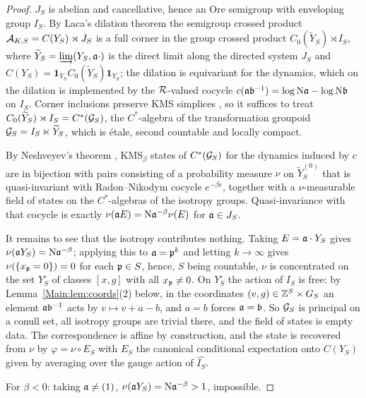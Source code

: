 \begin{proof}
$J_S$ is abelian and cancellative, hence an Ore semigroup with enveloping group
$I_S$. By Laca's dilation theorem \cite{Laca} the semigroup crossed product
$\mathcal{A}_{K,S}=C(Y_S)\rtimes J_S$ is a full corner in the group crossed product
$C_0(\widetilde Y_S)\rtimes I_S$, where
$\widetilde Y_S=\varinjlim(Y_S,\mathfrak{a}\cdot)$ is the direct limit along the
directed system $J_S$ and $C(Y_S)=\mathbf 1_{Y_S}C_0(\widetilde Y_S)\mathbf 1_{Y_S}$;
the dilation is equivariant for the dynamics, which on the dilation is
implemented by the $\mathcal{R}$-valued cocycle $c(\mathfrak{a}\mathfrak{b}^{-1})=\log\mathrm{N}\mathfrak{a}-\log\mathrm{N}\mathfrak{b}$
on $I_S$. Corner inclusions preserve KMS simplices \cite[\S3]{Laca}, so it
suffices to treat $C_0(\widetilde Y_S)\rtimes I_S=C^*(\mathcal{G}_S)$, the $C^*$-algebra
of the transformation groupoid $\mathcal{G}_S=I_S\ltimes\widetilde Y_S$, which is
étale, second countable and locally compact.

By Neshveyev's theorem \cite[Thm.~1.3]{Nesh13}, $\mathrm{KMS}_\beta$ states of
$C^*(\mathcal{G}_S)$ for the dynamics induced by $c$ are in bijection with pairs
consisting of a probability measure $\nu$ on $\widetilde Y_S^{(0)}$ that is
quasi-invariant with Radon--Nikodym cocycle $e^{-\beta c}$, together with a
$\nu$-measurable field of states on the $C^*$-algebras of the isotropy groups.
Quasi-invariance with that cocycle is exactly
$\nu(\mathfrak{a} E)=\mathrm{N}\mathfrak{a}^{-\beta}\nu(E)$ for $\mathfrak{a}\in J_S$.

It remains to see that the isotropy contributes nothing. Taking
$E=\mathfrak{a}\cdot Y_S$ gives $\nu(\mathfrak{a} Y_S)=\mathrm{N}\mathfrak{a}^{-\beta}$; applying this to
$\mathfrak{a}=\mathfrak{p}^k$ and letting $k\to\infty$ gives $\nu(\{x_{\mathfrak{p}}=0\})=0$ for each
$\mathfrak{p}\in S$, hence, $S$ being countable, $\nu$ is concentrated on the set
$Y_S^\circ$ of classes $[x,g]$ with all $x_{\mathfrak{p}}\neq0$. On $Y_S^\circ$ the action
of $I_S$ is free: by Lemma~\ref{Main:lem:coords}(2) below, in the coordinates
$(v,g)\in\mathbb{Z}^S\times G_S$ an element $\mathfrak{a}\mathfrak{b}^{-1}$ acts by
$v\mapsto v+a-b$, and $a=b$ forces $\mathfrak{a}=\mathfrak{b}$. So $\mathcal{G}_S$ is principal on a
conull set, all isotropy groups are trivial there, and the field of states is
empty data. The correspondence is affine by construction, and the state is
recovered from $\nu$ by $\varphi=\nu\circ E_S$ with $E_S$ the canonical
conditional expectation onto $C(Y_S)$ given by averaging over the gauge action
of $\widehat{I_S}$.

For $\beta<0$: taking $\mathfrak{a}\neq(1)$, $\nu(\mathfrak{a} Y_S)=\mathrm{N}\mathfrak{a}^{-\beta}>1$,
impossible.
\end{proof}

